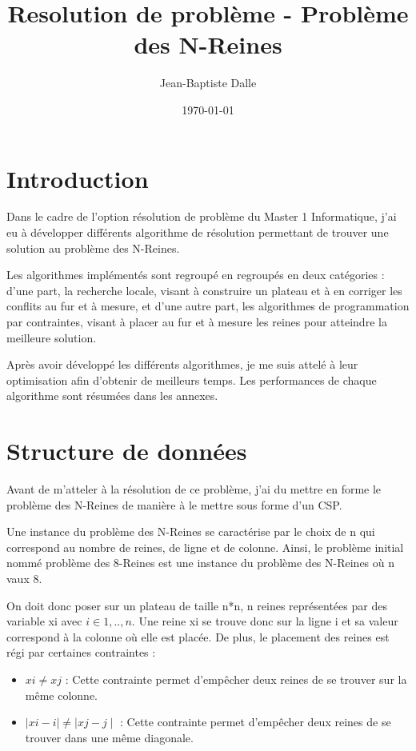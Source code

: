 \documentclass[a4paper,10pt]{article}
\title{Resolution de problème - Problème des N-Reines}
\author{Jean-Baptiste Dalle}
\date{\today}
\begin{document}
\maketitle

\newpage

\tableofcontents

\newpage

\section{Introduction}

Dans le cadre de l'option résolution de problème du Master 1 Informatique, j'ai eu à développer différents algorithme de résolution permettant de trouver une solution au problème des N-Reines.

Les algorithmes implémentés sont regroupé en regroupés en deux catégories : d'une part, la recherche locale, visant à construire un plateau et à en corriger les conflits au fur et à mesure, et d'une autre part, les algorithmes de programmation par contraintes, visant à placer au fur et à mesure les reines pour atteindre la meilleure solution.

Après avoir développé les différents algorithmes, je me suis attelé à leur optimisation afin d'obtenir de meilleurs temps. Les performances de chaque algorithme sont résumées dans les annexes.

\section{Structure de données}

Avant de m'atteler à la résolution de ce problème, j'ai du mettre en forme le problème des N-Reines de manière à le mettre sous forme d'un CSP.

Une instance du problème des N-Reines se caractérise par le choix de n qui correspond au nombre de reines, de ligne et de colonne. Ainsi, le problème initial nommé problème des 8-Reines est une instance du problème des N-Reines où n vaux 8.

On doit donc poser sur un plateau de taille n*n, n reines représentées par des variable xi avec $i \in {1,..,n}$. Une reine xi se trouve donc sur la ligne i et sa valeur correspond à la colonne où elle est placée. De plus, le placement des reines est régi par certaines contraintes : 

\begin{itemize}
 \item $xi \neq xj$ : Cette contrainte permet d'empêcher deux reines de se trouver sur la même colonne.
 \item $\mid xi - i\mid  \neq  \mid xj - j\mid$ : Cette contrainte permet d'empêcher deux reines de se trouver dans une même diagonale.
\end{itemize}
\end{document}
